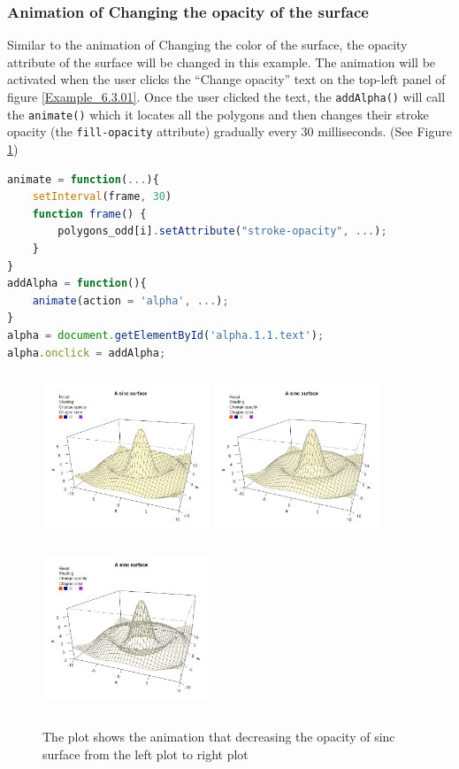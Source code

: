 \documentclass[11pt,twoside]{report}
\begin{document}
\newpage
\subsubsection*{Animation of Changing the opacity of the surface}
Similar to the animation of Changing the color of the surface, the opacity attribute of the surface will be changed in this example. The animation will be activated when the user clicks the ``Change opacity'' text on the top-left panel of figure \ref{Example_6.3.01}. Once the user clicked the text, the \texttt{addAlpha()} will call the \texttt{animate()} which it locates all the polygons and then changes their stroke opacity (the \texttt{fill-opacity} attribute) gradually every 30 milliseconds. (See Figure \ref{Example_6.3.2})
\begin{lstlisting}[language = JavaScript]
animate = function(...){
    setInterval(frame, 30)
    function frame() {
        polygons_odd[i].setAttribute("stroke-opacity", ...);
    }
}
addAlpha = function(){
    animate(action = 'alpha', ...);
}
alpha = document.getElementById('alpha.1.1.text');
alpha.onclick = addAlpha; 
\end{lstlisting}

\begin{figure}[h]
	\begin{center}
		\includegraphics[height = 5cm, width = 5cm]{figure/svg/origin_1.PNG}
		\includegraphics[height = 5cm, width = 5cm]{figure/svg/opacity_2.PNG}
		\includegraphics[height = 5cm, width = 5cm]{figure/svg/opacity_3.PNG}
		\caption{The plot shows the animation that decreasing the opacity of sinc surface from the left plot to right plot}
		\label{Example_6.3.2}
	\end{center}
\end{figure}
\end{document}
